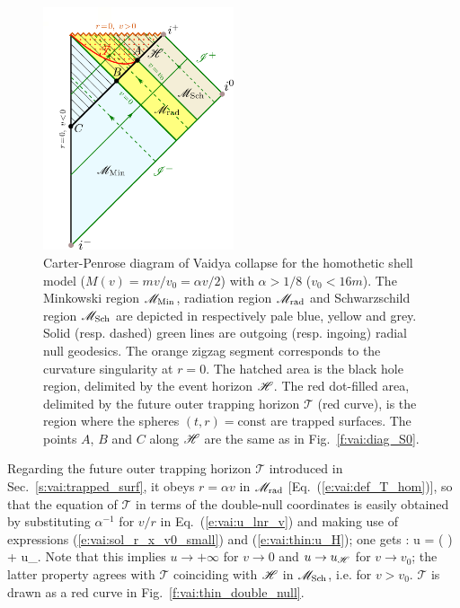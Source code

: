 \begin{figure}
\centerline{\includegraphics[width=0.5\textwidth]{vai_CPdiag_thin.pdf}}
\caption[]{\label{f:vai:CPdiag_thin} \footnotesize
Carter-Penrose diagram of Vaidya collapse
for the homothetic shell model ($M(v) = m v/v_0 = \alpha v /2$) with
$\alpha > 1/8$ ($v_0 < 16m$).
The Minkowski region $\mathscr{M}_{\rm Min}$, radiation region $\mathscr{M}_{\rm rad}$
and Schwarzschild region $\mathscr{M}_{\rm Sch}$ are depicted in respectively
pale blue, yellow and grey.
Solid (resp. dashed) green lines are outgoing (resp. ingoing)
radial null geodesics.
The orange zigzag segment corresponds to the curvature
singularity at $r=0$. The hatched area is the black hole region,
delimited by the event horizon $\mathscr{H}$.
The red dot-filled area, delimited by the future outer trapping horizon
$\mathscr{T}$ (red curve),
is the region where the spheres $(t,r)=\mathrm{const}$
are trapped surfaces.
The points $A$, $B$ and $C$ along $\mathscr{H}$ are the same as in Fig.~\ref{f:vai:diag_S0}.
}
\end{figure}

Regarding the future outer trapping horizon $\mathscr{T}$ introduced in
Sec.~\ref{s:vai:trapped_surf}, it obeys $r=\alpha v$ in $\mathscr{M}_{\rm rad}$
[Eq.~(\ref{e:vai:def_T_hom})],
so that the equation
of $\mathscr{T}$ in terms of the double-null coordinates is easily obtained
by substituting $\alpha^{-1}$ for $v/r$ in Eq.~(\ref{e:vai:u_lnr_v})
and making use of expressions (\ref{e:vai:sol_r_x_v0_small}) and (\ref{e:vai:thin:u_H}); one gets
\be \label{e:vai:thin:trap_uv}
  : \qquad  u = \ln\left(  \right) + u_\Hor .
\ee
Note that this implies $u\to +\infty$ for $v\to 0$ and $u\to u_{\mathscr{H}}$
for $v\to v_0$; the latter property agrees with $\mathscr{T}$ coinciding
with $\mathscr{H}$ in $\mathscr{M}_{\rm Sch}$, i.e. for $v > v_0$.
$\mathscr{T}$ is drawn as a red curve in Fig.~\ref{f:vai:thin_double_null}.

